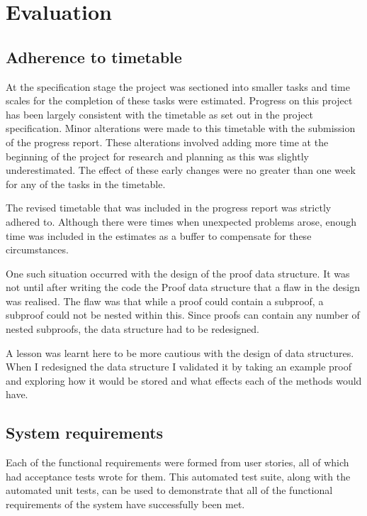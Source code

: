 \chapter{Evaluation}

\section{Adherence to timetable}

At the specification stage the project was sectioned into smaller tasks and time scales for the completion of these tasks were estimated. Progress on this project has been largely consistent with the timetable as set out in the project specification. Minor alterations were made to this timetable with the submission of the progress report. These alterations involved adding more time at the beginning of the project for research and planning as this was slightly underestimated. The effect of these early changes were no greater than one week for any of the tasks in the timetable.  

The revised timetable that was included in the progress report was strictly adhered to. Although there were times when unexpected problems arose, enough time was included in the estimates as a buffer to compensate for these circumstances. 

One such situation occurred with the design of the proof data structure. It was not until after writing the code the Proof data structure that a flaw in the design was realised. The flaw was that while a proof could contain a subproof, a subproof could not be nested within this. Since proofs can contain any number of nested subproofs, the data structure had to be redesigned. 

A lesson was learnt here to be more cautious with the design of data structures. When I redesigned the data structure I validated it by taking an example proof and exploring how it would be stored and what effects each of the methods would have.

\section{System requirements}

Each of the functional requirements were formed from user stories, all of which had acceptance tests wrote for them. This automated test suite, along with the automated unit tests, can be used to demonstrate that all of the functional requirements of the system have successfully been met.

